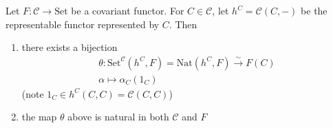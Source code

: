 \documentclass[12pt]{article}
\begin{document}
\begin{proposition}
	Let $F:\mathcal{C}\to\text{Set}$ be a covariant functor. For $C\in\mathcal{C}$, let $h^C=\mathcal{C}(C,-)$ be the representable functor represented by $C$. Then 
	\begin{enumerate}
		\item there exists a bijection 
			\begin{gather*}
				\theta: \text{Set}^\mathcal{C}(h^C, F)=\text{Nat}(h^C, F) \overset{\sim}{\to} F(C) \\
				\alpha \mapsto \alpha_C(1_C)
			\end{gather*}
			(note $1_C\in h^C(C,C)=\mathcal{C}(C,C)$)
		\item the map $\theta$ above is natural in both $\mathcal{C}$ and $F$
	\end{enumerate}
\end{proposition}
\end{document}

